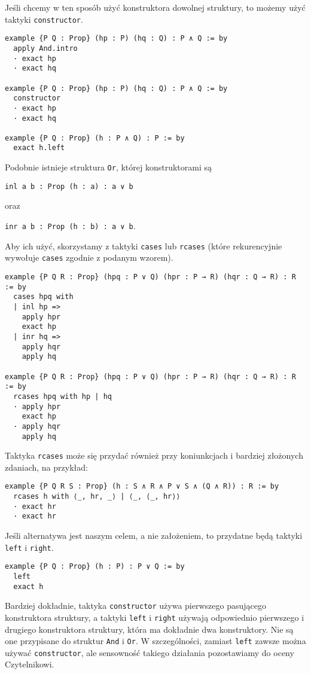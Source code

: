 \documentclass[polish,pretty]{angav}
\newcommand{\Lean}[1]{\texttt{#1}}
\newcommand{\centerLean}[2][]{\begin{center}\Lean{#2}#1\end{center}}
\begin{document}
Jeśli chcemy w ten sposób użyć konstruktora dowolnej struktury, to możemy użyć taktyki \Lean{constructor}.

\begin{verbatim}
example {P Q : Prop} (hp : P) (hq : Q) : P ∧ Q := by
  apply And.intro
  · exact hp
  · exact hq

example {P Q : Prop} (hp : P) (hq : Q) : P ∧ Q := by
  constructor
  · exact hp
  · exact hq

example {P Q : Prop} (h : P ∧ Q) : P := by
  exact h.left
\end{verbatim}

Podobnie istnieje struktura \Lean{Or}, której konstruktorami są
\centerLean{inl {a b : Prop} (h : a) : a ∨ b}
oraz
\centerLean[.]{inr {a b : Prop} (h : b) : a ∨ b}
Aby ich użyć, skorzystamy z taktyki \Lean{cases} lub \Lean{rcases} (które rekurencyjnie wywołuje \Lean{cases} zgodnie z podanym wzorem).
\begin{verbatim}
example {P Q R : Prop} (hpq : P ∨ Q) (hpr : P → R) (hqr : Q → R) : R := by
  cases hpq with
  | inl hp =>
    apply hpr
    exact hp
  | inr hq =>
    apply hqr
    apply hq

example {P Q R : Prop} (hpq : P ∨ Q) (hpr : P → R) (hqr : Q → R) : R := by
  rcases hpq with hp | hq
  · apply hpr
    exact hp
  · apply hqr
    apply hq
\end{verbatim}

Taktyka \Lean{rcases} może się przydać również przy koniunkcjach i bardziej złożonych zdaniach, na przykład:
\begin{verbatim}
example {P Q R S : Prop} (h : S ∧ R ∧ P ∨ S ∧ (Q ∧ R)) : R := by
  rcases h with ⟨_, hr, _⟩ | ⟨_, ⟨_, hr⟩⟩
  · exact hr
  · exact hr
\end{verbatim}

Jeśli alternatywa jest naszym celem, a nie założeniem, to przydatne będą taktyki \Lean{left} i \Lean{right}.

\begin{verbatim}
example {P Q : Prop} (h : P) : P ∨ Q := by
  left
  exact h
\end{verbatim}

\begin{remark}
    Bardziej dokładnie, taktyka \Lean{constructor} używa pierwszego pasującego konstruktora struktury, a taktyki \Lean{left} i \Lean{right} używają odpowiednio pierwszego i drugiego konstruktora struktury, która ma dokładnie dwa konstruktory. Nie są one przypisane do struktur \Lean{And} i \Lean{Or}. W szczególności, zamiast \Lean{left} zawsze można używać \Lean{constructor}, ale sensowność takiego działania pozostawiamy do oceny Czytelnikowi.
\end{remark}
\end{document}
